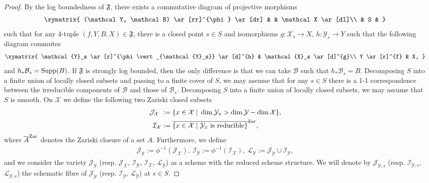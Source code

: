 \documentclass[11pt]{ip-journal}
\theoremstyle{definition}
\newcommand{\supp}{{\rm Supp}}
\newcommand{\mcy}{\mathcal{Y}}
\newcommand{\mcx}{\mathcal{X}}
\begin{document}
\begin{proof}
By the log boundedness of $\mathfrak F$, there exists a commutative diagram of projective morphisms 
\begin{align}
\label{fam.morf.eqn}
\xymatrix{
(\mathcal Y, \mathcal B) \ar[rr]^{\phi} \ar[dr] & 
&
\mathcal X \ar[dl]\\
 & S &
}
\end{align}
such that for any 4-tuple $(f, Y, B, X)\in \mathfrak{F}$, there is a closed point $s \in S$ and isomorphisms $g \colon \mathcal{X}_s \to X$, $h \colon \mathcal{Y}_s \to Y$ such that the following diagram commutes
\begin{align*}
\xymatrix{
\mathcal{Y}_s \ar[r]^{\phi\vert_{\mathcal{Y}_s}} \ar[d]^{h} & 
\mathcal{X}_s \ar[d]^{g}\\
Y  \ar[r]^{f} &
X,
}
\end{align*}
and $h_\ast \mathcal{B}_s = \supp(B)$. 
If $\mathfrak{F}$ is strongly log bounded, then the only difference is that we can take $\mathcal{B}$ such that $h_\ast \mathcal{B}_s=B$.
\newline
Decomposing $S$ into a finite union of locally closed subsets and passing to a finite cover of $S$, we may assume that for any $s\in S$ there is a 1-1 correspondence between the irreducible components of $\mathcal B$ and those of $\mathcal B_s$.
Decomposing $S$ into a finite union of locally closed subsets, we may assume that $S$ is smooth.
\newline
On 
$\mathcal X$ 
we define the following two Zariski closed subsets
\begin{align*}
\mathcal{J}_\mcx\ & :=
\{x \in \mathcal X \; \vert \; \dim \mathcal{Y}_x > \dim \mathcal Y -\dim \mathcal X
\},\\
\mathcal{I}_\mcx & :=\overline{\{x \in \mathcal X \; \vert \; \mathcal{Y}_x \textrm{ is reducible}\}}^{\rm Zar},    
\end{align*}
where 
$\overline{A}^{\rm Zar}$ 
denotes the Zariski closure of a set 
$A$.
Furthermore, we define
\begin{align*}
\mathcal{J}_\mcy := 
\phi^{-1} (\mathcal{J}_\mcx), \
\mathcal{I}_\mcy := 
\phi^{-1} (\mathcal{I}_\mcx), \
\mathcal{L}_\mcy := 
\mathcal{J}_\mcy \cup \mathcal{I}_\mcy,
\end{align*} 
and we consider the variety $\mathcal{J}_\mcy$ (resp. $\mathcal{J}_\mcx$, $\mathcal{I}_\mcy$, $\mathcal{I}_\mcx$, $\mathcal{L}_\mcy$) as a scheme with the reduced scheme structure.
We will denote by
$\mathcal{J}_{\mcy, s}$ (resp.
$\mathcal{I}_{\mcy, s}$, $\mathcal{L}_{\mcy, s}$)
the schematic fibre of $\mathcal{J}_{\mcy}$ (resp. $\mathcal{I}_{\mcy}$, $\mathcal{L}_{\mcy}$) at $s \in S$.


\end{proof}
\end{document}
